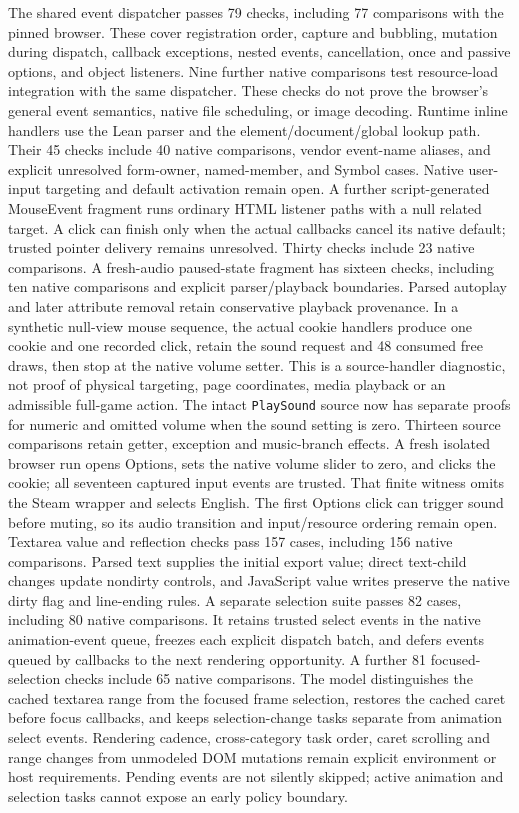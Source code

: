 \documentclass[11pt,a4paper]{article}
\numberwithin{equation}{section}
\theoremstyle{definition}
\theoremstyle{remark}
\begin{document}
The shared event dispatcher passes 79 checks, including 77 comparisons with the pinned browser. These cover registration order, capture and bubbling, mutation during dispatch, callback exceptions, nested events, cancellation, once and passive options, and object listeners. Nine further native comparisons test resource-load integration with the same dispatcher. These checks do not prove the browser's general event semantics, native file scheduling, or image decoding. Runtime inline handlers use the Lean parser and the element/document/global lookup path. Their 45 checks include 40 native comparisons, vendor event-name aliases, and explicit unresolved form-owner, named-member, and Symbol cases. Native user-input targeting and default activation remain open. A further script-generated MouseEvent fragment runs ordinary HTML listener paths with a null related target. A click can finish only when the actual callbacks cancel its native default; trusted pointer delivery remains unresolved. Thirty checks include 23 native comparisons. A fresh-audio paused-state fragment has sixteen checks, including ten native comparisons and explicit parser/playback boundaries. Parsed autoplay and later attribute removal retain conservative playback provenance. In a synthetic null-view mouse sequence, the actual cookie handlers produce one cookie and one recorded click, retain the sound request and 48 consumed free draws, then stop at the native volume setter. This is a source-handler diagnostic, not proof of physical targeting, page coordinates, media playback or an admissible full-game action. The intact \texttt{PlaySound} source now has separate proofs for numeric and omitted volume when the sound setting is zero. Thirteen source comparisons retain getter, exception and music-branch effects. A fresh isolated browser run opens Options, sets the native volume slider to zero, and clicks the cookie; all seventeen captured input events are trusted. That finite witness omits the Steam wrapper and selects English. The first Options click can trigger sound before muting, so its audio transition and input/resource ordering remain open. Textarea value and reflection checks pass 157 cases, including 156 native comparisons. Parsed text supplies the initial export value; direct text-child changes update nondirty controls, and JavaScript value writes preserve the native dirty flag and line-ending rules. A separate selection suite passes 82 cases, including 80 native comparisons. It retains trusted select events in the native animation-event queue, freezes each explicit dispatch batch, and defers events queued by callbacks to the next rendering opportunity. A further 81 focused-selection checks include 65 native comparisons. The model distinguishes the cached textarea range from the focused frame selection, restores the cached caret before focus callbacks, and keeps selection-change tasks separate from animation select events. Rendering cadence, cross-category task order, caret scrolling and range changes from unmodeled DOM mutations remain explicit environment or host requirements. Pending events are not silently skipped; active animation and selection tasks cannot expose an early policy boundary.
\end{document}
